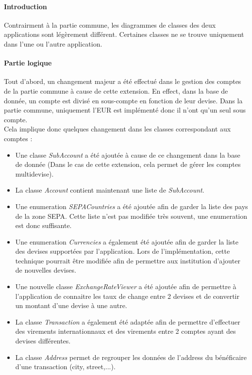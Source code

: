 \paragraph{Introduction} Contrairment à la partie commune, les diagrammes de classes des deux applications sont légèrement différent.
Certaines classes ne se trouve uniquement dans l'une ou l'autre application.

\paragraph{Partie logique}
Tout d'abord, un changement majeur a été effectué dans le gestion des comptes de la partie commune à cause de cette extension.
En effect, dans la base de donnée, un compte est divisé en sous-compte en fonction de leur devise. 
Dans la partie commune, uniquement l'EUR est implémenté donc il n'ont qu'un seul sous compte.\\
Cela implique donc quelques changement dans les classes correspondant aux comptes : \\

\begin{itemize}
    \item Une classe \emph{SubAccount} a été ajoutée à cause de ce changement dans la base de donnée (Dans le cas de cette extension, cela permet de gérer les comptes multidevise).
    \item La classe \emph{Account} contient maintenant une liste de \emph{SubAccount}.
    \item Une enumeration \emph{SEPACountries} a été ajoutée afin de garder la liste des pays de la zone SEPA. Cette liste n'est pas modifiée très souvent, une enumeration est donc suffisante.
    \item Une enumeration \emph{Currencies} a également été ajoutée afin de garder la liste des devises supportées par l'application.
        Lors de l'implémentation, cette technique pourrait être modifiée afin de permettre aux institution d'ajouter de nouvelles devises.
    \item Une nouvelle classe \emph{ExchangeRateViewer} a été ajoutée afin de permettre à l'application de connaitre les taux de change entre 2 devises et de convertir un montant d'une devise à une autre.
    \item La classe \emph{Transaction} a également été adaptée afin de permettre d'effectuer des virements internationnaux et des virements entre 2 comptes ayant des devises différentes.
    \item La classe \emph{Address} permet de regrouper les données de l'address du bénéficaire d'une transaction (city, street,...).
\end{itemize}

